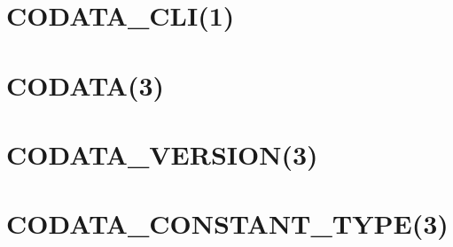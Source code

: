 {\setlength\parindent{0pt}
\setlength\parskip{0.5\baselineskip}

\chapter{CODATA\_CLI(1)}\label{codata(1)}


\clearpage
\chapter{CODATA(3)}\label{codata(3)}


\clearpage
\chapter{CODATA\_VERSION(3)}\label{codata_version(3)}


\clearpage
\chapter{CODATA\_CONSTANT\_TYPE(3)}\label{codata_constant_type(3)}

}
